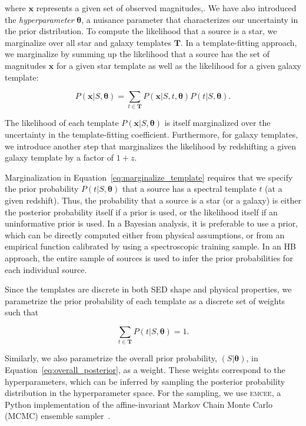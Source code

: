 \noindent
where $\mathbf{x}$ represents a given set of observed magnitudes,.
We have also introduced the \textit{hyperparameter} $\mathbf{\theta}$,
a nuisance parameter that characterizes our uncertainty
in the prior distribution.
To compute the likelihood that a source is a star,
we marginalize over all star and galaxy templates $\mathbf{T}$.
In a template-fitting approach,
we marginalize by summing up
the likelihood that a source has the set of magnitudes $\mathbf{x}$
for a given star template
as well as the likelihood for a given galaxy template:

\begin{equation} \label{eq:marginalize_template}
  P \left(\mathbf{x} | S, \mathbf{\theta} \right)
  = \sum_{t \in \mathbf{T}}
  P \left(\mathbf{x} | S, t, \mathbf{\theta} \right)
  P \left(t | S, \mathbf{\theta} \right).
\end{equation}

\noindent
The likelihood of each template
$P \left( \mathbf{x} | S, \mathbf{\theta} \right)$
is itself marginalized over the uncertainty
in the template-fitting coefficient.
Furthermore, for galaxy templates, we introduce another step that 
marginalizes the likelihood by redshifting a given galaxy template
by a factor of $1 + z$.

Marginalization in Equation~\ref{eq:marginalize_template}
requires that we specify the prior probability
$P \left(t | S, \mathbf{\theta} \right)$
that a source has a spectral template $t$ (at a given redshift).
Thus, the probability that a source is a star (or a galaxy)
is either the posterior probability itself
if a prior is used,
or the likelihood itself if an uninformative prior is used.
In a Bayesian analysis, it is preferable to use a prior,
which can be directly computed either from physical assumptions,
or from an empirical function calibrated by
using a spectroscopic training sample.
In an HB approach, the entire sample of sources is used to
infer the prior probabilities for each individual source.

Since the templates are discrete in both SED shape and physical properties,
we parametrize the prior probability of each template
as a discrete set of weights such that

\begin{equation}
\sum_{t \in \mathbf{T}}
P \left(t | S, \mathbf{\theta} \right) = 1.
\end{equation}

\noindent
Similarly, we also parametrize the overall prior probability,
$\left(S | \mathbf{\theta}\right)$, in Equation~\ref{eq:overall_posterior},
as a weight.
These weights correspond to the hyperparameters,
which can be inferred by sampling
the posterior probability distribution in the hyperparameter space.
For the sampling, we use \textsc{emcee}, a Python implementation of the
affine-invariant Markov Chain Monte Carlo (MCMC) ensemble sampler~\citep{Foreman-Mackey2013}.  

